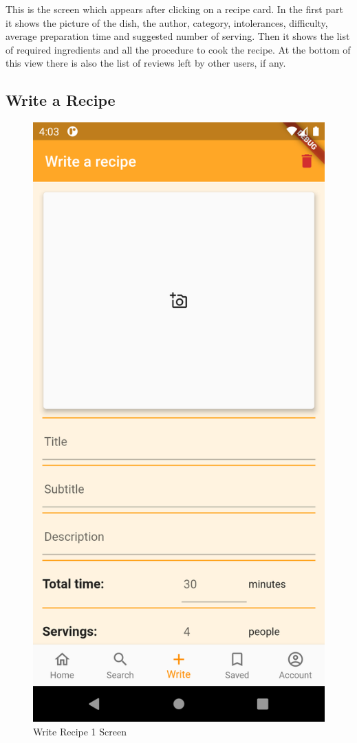 This is the screen which appears after clicking on a recipe card.
In the first part it shows the picture of the dish, the author, category, intolerances, difficulty, average preparation time and suggested number of serving.
Then it shows the list of required ingredients and all the procedure to cook the recipe.
At the bottom of this view there is also the list of reviews left by other users, if any.

\subsection{Write a Recipe}
\begin{figure}[H]
	\begin{minipage}{0.31\textwidth}
		\centering
		\includegraphics[width = .7\linewidth]{img/Write_1.png}
		\caption{Write Recipe 1 Screen}
	\end{minipage}\hfill

\end{figure}
